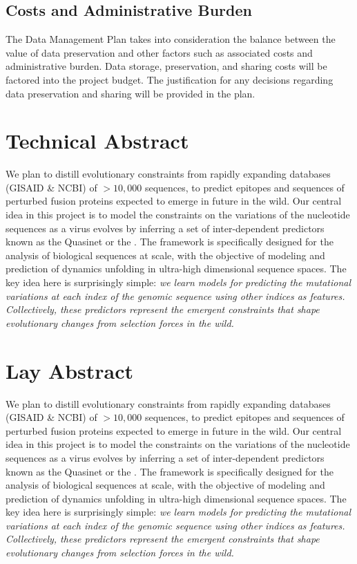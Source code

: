 \documentclass[onecolumn, compsoc,12pt]{IEEEtran}
\begin{document}
\subsection{Costs and Administrative Burden}

The Data Management Plan takes into consideration the balance between the value of data preservation and other factors such as associated costs and administrative burden. Data storage, preservation, and sharing costs will be factored into the project budget. The justification for any decisions regarding data preservation and sharing will be provided in the plan.




\clearpage
{}

\section*{Technical Abstract}

We plan to distill  evolutionary constraints from  rapidly expanding  databases (GISAID \& NCBI) of $> 10,000$  \hcov sequences, to predict  epitopes and sequences of perturbed fusion proteins expected to emerge in future in the wild. Our central idea in this project  is to model the constraints on the variations of the nucleotide sequences as a virus evolves by inferring a set of inter-dependent predictors known as the  Quasinet or the \qnet. The \qnet framework  is  specifically designed for the analysis of biological sequences at scale, with the  objective of modeling and prediction of dynamics unfolding in ultra-high dimensional sequence spaces. The key idea here is surprisingly simple: \textit{we learn models for predicting the mutational variations at each index of the genomic sequence using other indices  as features. Collectively, these predictors represent the emergent constraints that shape evolutionary changes from selection forces in the wild.}

\clearpage

\section*{Lay Abstract}

We plan to distill  evolutionary constraints from  rapidly expanding  databases (GISAID \& NCBI) of $> 10,000$  \hcov sequences, to predict  epitopes and sequences of perturbed fusion proteins expected to emerge in future in the wild. Our central idea in this project  is to model the constraints on the variations of the nucleotide sequences as a virus evolves by inferring a set of inter-dependent predictors known as the  Quasinet or the \qnet. The \qnet framework  is  specifically designed for the analysis of biological sequences at scale, with the  objective of modeling and prediction of dynamics unfolding in ultra-high dimensional sequence spaces. The key idea here is surprisingly simple: \textit{we learn models for predicting the mutational variations at each index of the genomic sequence using other indices  as features. Collectively, these predictors represent the emergent constraints that shape evolutionary changes from selection forces in the wild.}
\end{document}
